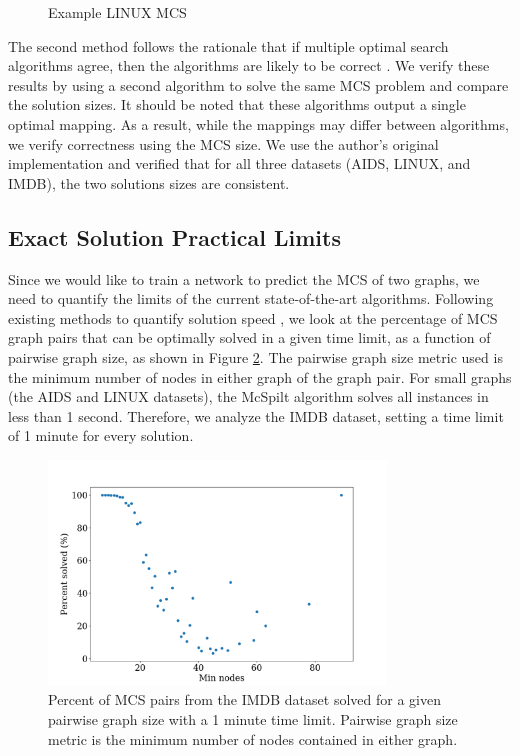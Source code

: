 \begin{figure}[!tbp]
\begin{minipage}[b]{0.4\textwidth}
        \caption{Example LINUX MCS}
        \label{fig:linux-mcs}
    \end{minipage}
\end{figure}


The second method follows the rationale that if multiple optimal search algorithms agree, then the algorithms are likely to be correct \cite{korf2014you}. We verify these results by using a second algorithm \cite{mccreesh2016clique} to solve the same MCS problem and compare the solution sizes. It should be noted that these algorithms output a single optimal mapping. As a result, while the mappings may differ between algorithms, we verify correctness using the MCS size. We use the author's original implementation and verified that for all three datasets (AIDS, LINUX, and IMDB), the two solutions sizes are consistent.

\subsection{Exact Solution Practical Limits}
Since we would like to train a network to predict the MCS of two graphs, we need to quantify the limits of the current state-of-the-art algorithms. Following existing methods to quantify solution speed \cite{hoffmann2018observations}, we look at the percentage of MCS graph pairs that can be optimally solved in a given time limit, as a function of pairwise graph size, as shown in Figure \ref{fig:solution_limits}. The pairwise graph size metric used is the minimum number of nodes in either graph of the graph pair. For small graphs (the AIDS and LINUX datasets), the McSpilt algorithm solves all instances in less than 1 second. Therefore, we analyze the IMDB dataset, setting a time limit of 1 minute for every solution.

\begin{figure}
    \center
    \includegraphics[width=0.8\textwidth]{figures/pct_solved_avg_nodes.png}
    \caption{Percent of MCS pairs from the IMDB dataset solved for a given pairwise graph size with a 1 minute time limit. Pairwise graph size metric is the minimum number of nodes contained in either graph.}
    \label{fig:solution_limits}
\end{figure}

